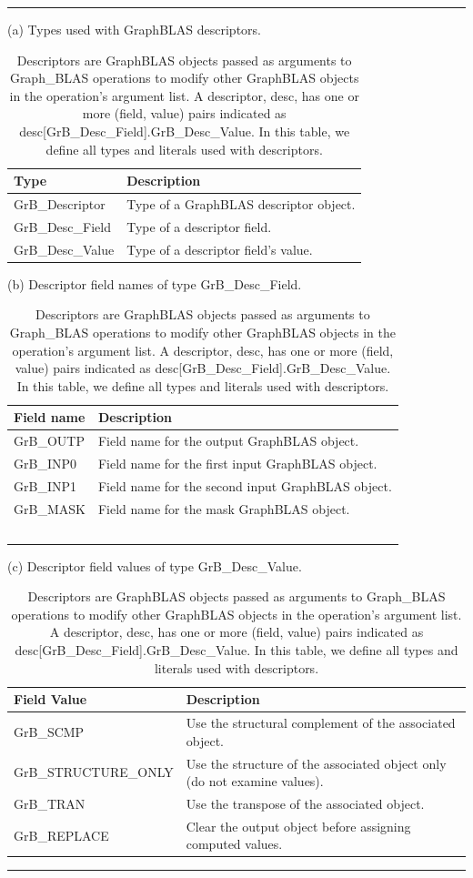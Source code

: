 \begin{table}
\hrule
\begin{center}
\caption{Descriptors are GraphBLAS objects passed as arguments to Graph\_BLAS 
operations to modify other GraphBLAS objects in the operation's argument list.
A descriptor, {\sf desc}, has one or more (field, value) pairs indicated 
as  {\sf desc[GrB\_Desc\_Field].GrB\_Desc\_Value}. In this table, we define all types and literals used
with descriptors.}
\label{Tab:DescTypeLiterals}

\vspace{1\baselineskip}
(a) Types used with GraphBLAS descriptors.
\vspace{1\baselineskip}

\begin{tabular}{l|l}
Type			& Description \\ \hline
{\sf GrB\_Descriptor}     &  Type of a GraphBLAS descriptor object. \\
{\sf GrB\_Desc\_Field}              &  Type of a descriptor field. \\
{\sf GrB\_Desc\_Value}             &  Type of a descriptor field's value. \\
\end{tabular}

\vspace{1\baselineskip}
(b) Descriptor field names of type {\sf GrB\_Desc\_Field}.
\vspace{1\baselineskip}

\begin{tabular}{l|l}
Field name          & Description \\ \hline
{\sf GrB\_OUTP} &  Field name for the output GraphBLAS object. \\
{\sf GrB\_INP0}   &  Field name for the first input GraphBLAS object. \\
{\sf GrB\_INP1}   &  Field name for the second input  GraphBLAS object. \\
{\sf GrB\_MASK} &  Field name for the mask GraphBLAS object. \\\
\end{tabular}

\vspace{1\baselineskip}
(c) Descriptor field values of type {\sf GrB\_Desc\_Value}.
\vspace{1\baselineskip}

\begin{tabular}{l|l}
Field Value                & Description \\ \hline
{\sf GrB\_SCMP}            &  Use the structural complement of the associated object.\\
{\sf GrB\_STRUCTURE\_ONLY} &  Use the structure of the associated object only (do not examine values).\\
{\sf GrB\_TRAN}            &  Use the transpose of the associated object.\\
{\sf GrB\_REPLACE}         &  Clear the output object before assigning computed values.\\
\end{tabular}
\end{center}
\hrule
\end{table}

